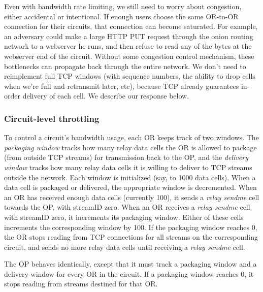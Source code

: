 \documentclass[times,10pt,twocolumn]{article}
\begin{document}
\label{subsec:congestion}

Even with bandwidth rate limiting, we still need to worry about
congestion, either accidental or intentional. If enough users choose the
same OR-to-OR connection for their circuits, that connection can become
saturated. For example, an adversary could make a large HTTP PUT request
through the onion routing network to a webserver he runs, and then
refuse to read any of the bytes at the webserver end of the
circuit. Without some congestion control mechanism, these bottlenecks
can propagate back through the entire network. We don't need to
reimplement full TCP windows (with sequence numbers,
the ability to drop cells when we're full and retransmit later, etc),
because TCP already guarantees in-order delivery of each
cell. 
We describe our response below.

\subsubsection{Circuit-level throttling}

To control a circuit's bandwidth usage, each OR keeps track of two
windows. The \emph{packaging window} tracks how many relay data cells the OR is
allowed to package (from outside TCP streams) for transmission back to the OP,
and the \emph{delivery window} tracks how many relay data cells it is willing
to deliver to TCP streams outside the network. Each window is initialized
(say, to 1000 data cells). When a data cell is packaged or delivered,
the appropriate window is decremented. When an OR has received enough
data cells (currently 100), it sends a \emph{relay sendme} cell towards the OP,
with streamID zero. When an OR receives a \emph{relay sendme} cell with
streamID zero, it increments its packaging window. Either of these cells
increments the corresponding window by 100. If the packaging window
reaches 0, the OR stops reading from TCP connections for all streams
on the corresponding circuit, and sends no more relay data cells until
receiving a \emph{relay sendme} cell.

The OP behaves identically, except that it must track a packaging window
and a delivery window for every OR in the circuit. If a packaging window
reaches 0, it stops reading from streams destined for that OR.
\end{document}
